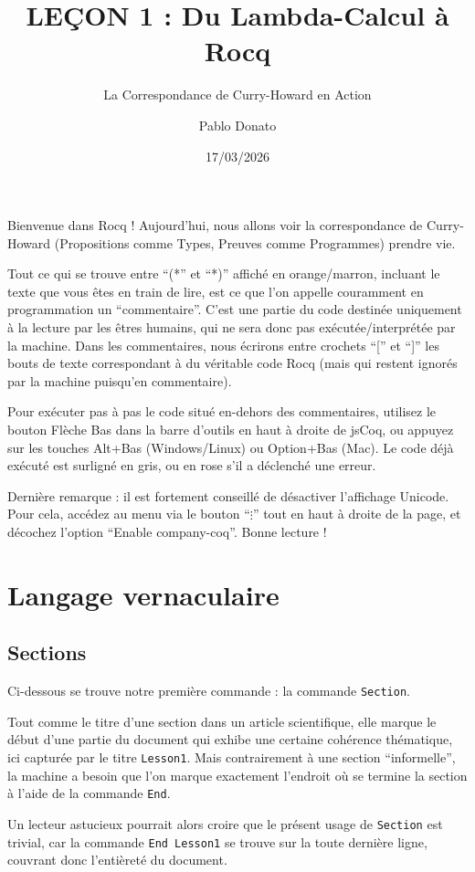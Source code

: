 \documentclass[11pt,a4paper]{article}
\title{LEÇON 1 : Du Lambda-Calcul à Rocq}
\subtitle{La Correspondance de Curry-Howard en Action}
\date{17/03/2026}
\author{Pablo Donato}
\makeatletter
\let\oldmaketitle\maketitle
\renewcommand{\maketitle}{%
  \let\oldtitle\@title
  \renewcommand{\@title}{\oldtitle\\[1em]\Large\normalfont\@subtitle}%
  \oldmaketitle
}
\makeatother
\begin{document}
\maketitle

Bienvenue dans Rocq ! Aujourd'hui, nous allons voir la correspondance de Curry-Howard (Propositions comme Types, Preuves comme Programmes) prendre vie.

Tout ce qui se trouve entre ``(*'' et ``*)'' affiché en orange/marron, incluant le texte que vous êtes en train de lire, est ce que l'on appelle couramment en programmation un ``commentaire''. C'est une partie du code destinée uniquement à la lecture par les êtres humains, qui ne sera donc pas exécutée/interprétée par la machine. Dans les commentaires, nous écrirons entre crochets ``['' et ``]'' les bouts de texte correspondant à du véritable code Rocq (mais qui restent ignorés par la machine puisqu'en commentaire).

Pour exécuter pas à pas le code situé en-dehors des commentaires, utilisez le bouton Flèche Bas dans la barre d'outils en haut à droite de jsCoq, ou appuyez sur les touches Alt+Bas (Windows/Linux) ou Option+Bas (Mac). Le code déjà exécuté est surligné en gris, ou en rose s'il a déclenché une erreur.

Dernière remarque : il est fortement conseillé de désactiver l'affichage Unicode. Pour cela, accédez au menu via le bouton ``$\vdots$'' tout en haut à droite de la page, et décochez l'option ``Enable company-coq''. Bonne lecture !

\section{Langage vernaculaire}

\subsection*{Sections}

Ci-dessous se trouve notre première commande : la commande \texttt{Section}.

Tout comme le titre d'une section dans un article scientifique, elle marque le début d'une partie du document qui exhibe une certaine cohérence thématique, ici capturée par le titre \texttt{Lesson1}. Mais contrairement à une section ``informelle'', la machine a besoin que l'on marque exactement l'endroit où se termine la section à l'aide de la commande \texttt{End}.

Un lecteur astucieux pourrait alors croire que le présent usage de \texttt{Section} est trivial, car la commande \texttt{End Lesson1} se trouve sur la toute dernière ligne, couvrant donc l'entièreté du document.
\end{document}
